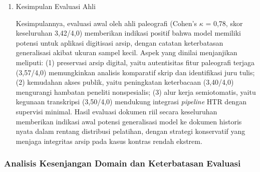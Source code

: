 \documentclass[12pt,a4paper]{article}
\begin{document}
\begin{enumerate}[leftmargin=1.5em, labelsep=0.5em, itemindent=0pt, label=\arabic*., topsep=0pt, partopsep=0pt]
\begin{enumerate}[leftmargin=1.5em, labelsep=0.5em, itemindent=0pt, noitemsep, topsep=0pt, label=\alph*)]
    \item Penilai 2 (ahli restorasi arsip): Dari perspektif arsip digital, keluaran model sangat sesuai untuk digitisasi massal dengan koreksi manual minimal. Reduksi derau latar pada mayoritas dokumen sangat membantu proses OCR/HTR selanjutnya. Apresiasi khusus untuk pendekatan konservatif pada dokumen memudar ekstrem; model tidak melakukan \textit{creative reconstruction} yang dapat menyesatkan interpretasi historis. Untuk alur kerja ANRI, disarankan penggunaan untuk praproses \textit{batch} dengan verifikasi ahli pada kasus kontras $<$30.

    \item \textit{Kesepakatan antarpenilai:} Ketidaksepakatan terbesar terjadi pada kriteria \textit{Minimasi Artefak} untuk dokumen kontras sedang; Penilai 1 lebih toleran terhadap derau residual dibanding Penilai 2 yang memprioritaskan kebersihan untuk otomasi OCR. Namun, kedua penilai sepakat pada urutan relatif dokumen (Spearman's $\rho$ = 0,91, p$<$0,001).
\end{enumerate}


    \item Kesimpulan Evaluasi Ahli
\label{subsubsubsec:kesimpulan-evaluasi-ahli}

Kesimpulannya, evaluasi awal oleh ahli paleografi (Cohen's $\kappa$ = 0,78, skor keseluruhan 3,42/4,0) memberikan indikasi positif bahwa model memiliki potensi untuk aplikasi digitisasi arsip, dengan catatan keterbatasan generalisasi akibat ukuran sampel kecil. Aspek yang dinilai menjanjikan meliputi: (1) preservasi arsip digital, yaitu autentisitas fitur paleografi terjaga (3,57/4,0) memungkinkan analisis komparatif skrip dan identifikasi juru tulis; (2) kemudahan akses publik, yaitu peningkatan keterbacaan (3,40/4,0) mengurangi hambatan peneliti nonspesialis; (3) alur kerja semiotomatis, yaitu kegunaan transkripsi (3,50/4,0) mendukung integrasi \textit{pipeline} HTR dengan supervisi minimal. Hasil evaluasi dokumen riil secara keseluruhan memberikan indikasi awal potensi generalisasi model ke dokumen historis nyata dalam rentang distribusi pelatihan, dengan strategi konservatif yang menjaga integritas arsip pada kasus kontras rendah ekstrem.
\end{enumerate}

\subsubsection{Analisis Kesenjangan Domain dan Keterbatasan Evaluasi}
\label{subsubsec:anri-domain-shift}
\end{document}
